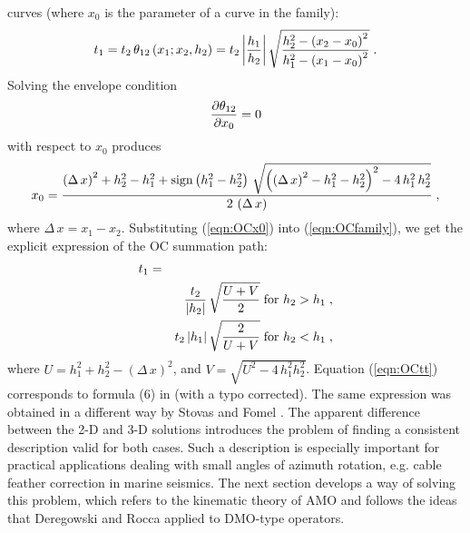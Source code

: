 curves (where $x_0$ is the parameter of a curve in the family):
\begin{equation}
t_1=t_2\,\theta_{12}\left(x_1;x_2, h_2\right) =
t_2\,{\left| h_1 \over h_2\right|}\,
\sqrt{ {h_2^2-\left(x_2-x_0\right)^2} \over
{h_1^2-\left(x_1-x_0\right)^2}}\;.
\label{eqn:OCfamily}
\end{equation} 
Solving the envelope condition
\begin{equation}
{\partial \theta_{12} \over \partial x_0}=0
\label{eqn:OCenvelop}
\end{equation}
with respect to $x_0$ produces
\begin{equation}
x_0={{\left(\Delta\,x\right)^2+h_2^2-h_1^2+
\mbox{sign}\left(h_1^2-h_2^2\right)\,
\sqrt{\left(\left(\Delta\,x\right)^2-h_1^2-h_2^2\right)^2-4\,h_1^2\,h_2^2}}
\over {2\,\left(\Delta\,x\right)}}\;,
\label{eqn:OCx0}
\end{equation}
where $\Delta\,x=x_1-x_2$.
Substituting (\ref{eqn:OCx0}) into (\ref{eqn:OCfamily}), we get the explicit
expression of the OC summation path:
\begin{eqnarray}
t_1 & = & \nonumber \\
& & {t_2 \over \left|h_2\right|}\,\sqrt{{U+V} \over 2}
\;\mbox{for $h_2 > h_1$}\;, \nonumber \\
& & {t_2 \left|h_1\right|}\,\sqrt{2 \over {U+V}}
\;\mbox{for $h_2 < h_1$}\;, 
\label{eqn:OCtt}
\end{eqnarray}  
where $U=h_1^2+h_2^2-\left(\Delta\,x\right)^2$, and
$V=\sqrt{U^2-4\,h_1^2h_2^2}$.
Equation (\ref{eqn:OCtt}) corresponds to formula (6) in
\cite{Biondi.sep.80.125} (with a typo corrected). The same
expression was obtained in a different way by Stovas and Fomel
. 
The apparent difference between the 2-D and 3-D solutions introduces the
problem of finding a consistent description valid for both cases.
Such a description is especially important for practical applications
dealing with small angles of azimuth rotation, e.g. cable feather
correction in marine seismics. The next section develops
a way of solving
this problem, which
refers to the kinematic theory of AMO and follows the ideas that
Deregowski and Rocca  applied
to DMO-type operators.    


